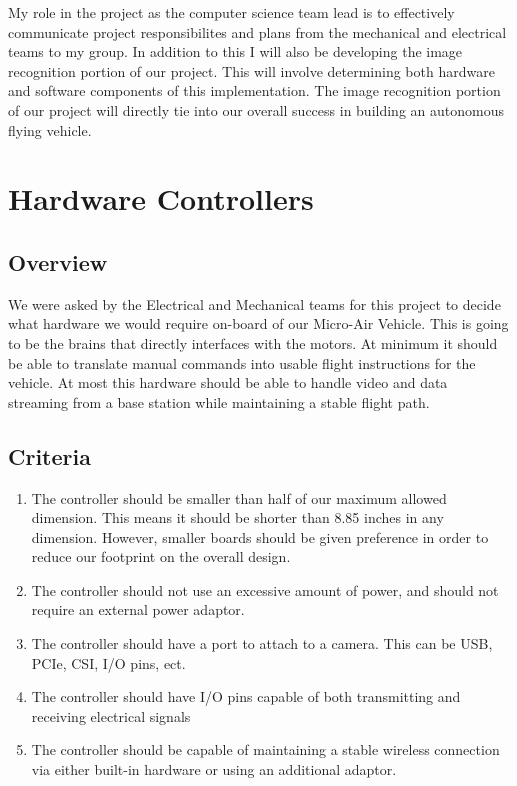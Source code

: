 \documentclass[letterpaper, 10, draftclsnofoot, onecolumn, compsoc]{IEEEtran}
\begin{document}
My role in the project as the computer science team lead is to effectively 
communicate project responsibilites and plans from the mechanical and electrical 
teams to my group. In addition to this I will also be developing the image 
recognition portion of our project. This will involve determining both hardware 
and software components of this implementation. The image recognition portion of 
our project will directly tie into our overall success in building an autonomous 
flying vehicle.  

\section{Hardware Controllers}

\subsection{Overview}

We were asked by the Electrical and Mechanical teams for this 
project to decide what hardware we would require on-board of our 
Micro-Air Vehicle. This is going to be the brains that directly 
interfaces with the motors. At minimum it should be able to 
translate manual commands into usable flight instructions for the 
vehicle. At most this hardware should be able to handle video and 
data streaming from a base station while maintaining a stable 
flight path. 

\subsection{Criteria}
\begin{enumerate}
\item{The controller should  be smaller than half of our maximum 
allowed dimension. This means it should be shorter than 8.85 inches 
in any dimension. However, smaller boards should be given 
preference in order to reduce our footprint on the overall design.}

\item{The controller should not use an excessive amount of power, 
and should not require an external power adaptor. }

\item{The controller should have a port to attach to a camera. This 
can be USB, PCIe, CSI, I/O pins, ect.}

\item{The controller should have I/O pins capable of both 
transmitting and receiving electrical signals}

\item{The controller should be capable of maintaining a stable 
wireless connection via either built-in hardware or using an 
additional adaptor.}
\end{enumerate}
\end{document}
